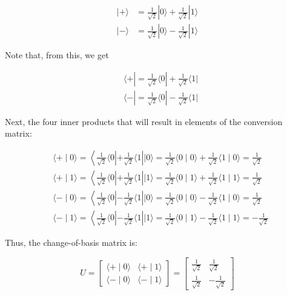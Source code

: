 \documentclass[main.tex]{subfiles}
\begin{document}
    $$
    \begin{aligned}
    |+\rangle &=\frac{1}{\sqrt{2}}|0\rangle+\frac{1}{\sqrt{2}}|1\rangle \\
    |-\rangle &=\frac{1}{\sqrt{2}}|0\rangle-\frac{1}{\sqrt{2}}|1\rangle
    \end{aligned}
    $$
    
    Note that, from this, we get
    
    $$
    \begin{aligned}
    &\langle+|=\frac{1}{\sqrt{2}}\langle 0|+\frac{1}{\sqrt{2}}\langle 1| \\
    &\langle-|=\frac{1}{\sqrt{2}}\langle 0|-\frac{1}{\sqrt{2}}\langle 1|
    \end{aligned}
    $$
    
    Next, the four inner products that will result in elements of the conversion matrix:
    
    $$
    \begin{aligned}
    &\langle+\mid 0\rangle=\left\langle\frac{1}{\sqrt{2}}\langle 0|+\frac{1}{\sqrt{2}}\langle 1|| 0\rangle=\frac{1}{\sqrt{2}}\langle 0 \mid 0\rangle+\frac{1}{\sqrt{2}}\langle 1 \mid 0\rangle=\frac{1}{\sqrt{2}}\right. \\
    &\langle+\mid 1\rangle=\left\langle\frac{1}{\sqrt{2}}\langle 0|+\frac{1}{\sqrt{2}}\langle 1|| 1\rangle=\frac{1}{\sqrt{2}}\langle 0 \mid 1\rangle+\frac{1}{\sqrt{2}}\langle 1 \mid 1\rangle=\frac{1}{\sqrt{2}}\right. \\
    &\langle-\mid 0\rangle=\left\langle\frac{1}{\sqrt{2}}\langle 0|-\frac{1}{\sqrt{2}}\langle 1|| 0\rangle=\frac{1}{\sqrt{2}}\langle 0 \mid 0\rangle-\frac{1}{\sqrt{2}}\langle 1 \mid 0\rangle=\frac{1}{\sqrt{2}}\right. \\
    &\langle-\mid 1\rangle=\left\langle\frac{1}{\sqrt{2}}\langle 0|-\frac{1}{\sqrt{2}}\langle 1|| 1\rangle=\frac{1}{\sqrt{2}}\langle 0 \mid 1\rangle-\frac{1}{\sqrt{2}}\langle 1 \mid 1\rangle=-\frac{1}{\sqrt{2}}\right.
    \end{aligned}
    $$
    
    Thus, the change-of-basis matrix is:
    
    $$
    U=\left[\begin{array}{ll}
    \langle+\mid 0\rangle & \langle+\mid 1\rangle \\
    \langle-\mid 0\rangle & \langle-\mid 1\rangle
    \end{array}\right]=\left[\begin{array}{cc}
    \frac{1}{\sqrt{2}} & \frac{1}{\sqrt{2}} \\
    \frac{1}{\sqrt{2}} & -\frac{1}{\sqrt{2}}
    \end{array}\right]
    $$
    
\end{document}
